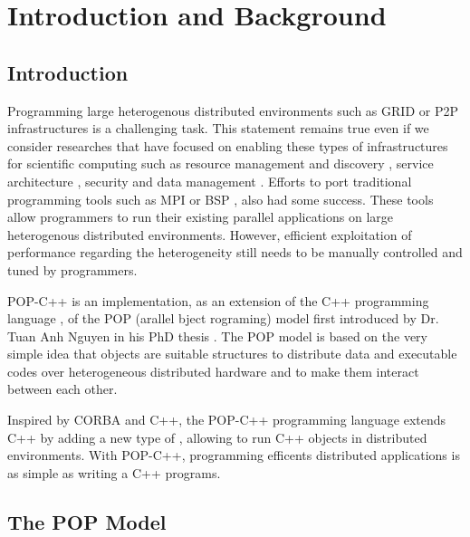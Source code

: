 \chapter{Introduction and Background}
\setcounter{page}{1}

\section{Introduction}

Programming large heterogenous distributed environments such as GRID or P2P
infrastructures is a challenging task. This statement remains true even if
we consider researches that have focused on enabling these types of
infrastructures for scientific computing such as resource management and
discovery \cite{Foster97, Grimshaw99, Czajkowski98}, service architecture
\cite{Foster02}, security \cite{Welch03} and data management
\cite{Allcock02, Stockinger01}.
Efforts to port traditional programming tools such as MPI
\cite{Foster98:2, Roy00, Karonis03} or BSP \cite{Tong03, Williams00},
also had some success. These tools allow programmers to run their existing
parallel applications on large heterogenous distributed environments. However,
efficient exploitation of performance regarding the heterogeneity still
needs to be manually controlled and tuned by programmers.

POP-C++ is an implementation, as an extension of the C++ programming
language \cite{Nguyen07}, of the POP (arallel bject
rograming) model first introduced by Dr. Tuan Anh Nguyen in
his PhD thesis \cite{Nguyen04}. The POP model is based on the very simple
idea that objects are suitable structures to distribute data and executable
codes over heterogeneous distributed hardware and to make them interact
between each other.

Inspired by CORBA \cite{corba26} and C++, the POP-C++ programming
language extends C++ by adding a new type of ,
allowing to run C++ objects in distributed environments. With POP-C++,
programming efficents distributed applications is as simple as writing
a C++ programs. 

\section{The POP Model}


